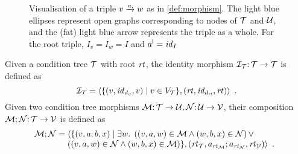 \begin{figure}
\centering

\caption{Visualisation of a triple $\trip vaw$ as in \cref{def:morphism}. The light blue ellipses represent open graphs corresponding to nodes of ${\mathcal{T}}$ and ${\mathcal{U}}$, and the (fat) light blue arrow represents the triple as a whole. For the root triple, $I_v=I_w=I$ and $a^{\mathsf I}={\mathit{id}}_I$}
\label{fig:triple}
\end{figure}
\begin{comment}
\todo[inline]{We could extend the child relation to triples, as follows.}
\noindent Given a morphism $\cM$, we define a parent relation ${\parentof}\subseteq \cM\times \cM$ as follows:
\[ (v,a,w)\parentof (y,b,x) \;\Leftrightarrow\; v\parentof x\wedge w\parentof y \wedge u_y=b\I;u_x;a\P \enspace. \]
\todo[inline]{This might provide a more acceresible and uniform way to define the notions of direct (preservation and reflection) evidence.}
\end{comment}
%
Given a condition tree ${\mathcal{T}}$ with root $\mathit{rt}$, the identity morphism ${\mathcal{I}}_{\mathcal{T}}{:}\, {\mathcal{T}}\rightarrow{\mathcal{T}}$ is defined as
\[ {\mathcal{I}}_{\mathcal{T}} = \langle \{{{(v,{\mathit{id}}_{d_v},v)}\mid{v\in V_{\mathcal{T}}}}\},(\mathit{rt},{\mathit{id}}_{d_{\mathit{rt}}},\mathit{rt})\rangle \enspace. \]
Given two condition tree morphisms ${\mathcal{M}}{:}\, {\mathcal{T}}\rightarrow {\mathcal{U}},{\mathcal{N}}{:}\, {\mathcal{U}}\rightarrow {\mathcal{V}}$, their composition ${\mathcal{M}};{\mathcal{N}}{:}\, {\mathcal{T}}\rightarrow {\mathcal{V}}$ is defined as
\[ \cM;\cN =
\begin{array}[t]{@{}l}
	\langle\{ (v,a;b,x) \mid \exists w\st \left( (v,a,w) \in \cM \wedge (w,b,x)\in \cN\right) \vee\\ 
	\left( (v,a,w) \in \cN \wedge (w,b,x)\in \cM\right)\},(\rtof\cT,a_{\rtof\cM};a_{\rtof\cN},\rtof\cV)\rangle\enspace.
\end{array}
\]
